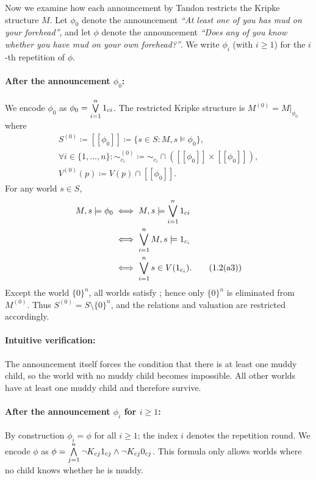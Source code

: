 Now we examine how each announcement by Tandon restricts the 
Kripke structure $M$. Let $\phi_0$ denote the announcement 
\emph{``At least one of you has mud on your forehead''}, 
and let $\phi$ denote the announcement 
\emph{``Does any of you know whether you have mud on your own forehead?''}. 
We write $\phi_i$ (with $i \ge 1$) for the $i$-th repetition of $\phi$.

\paragraph*{After the announcement $\phi_0$:}
We encode $\phi_0$ as $\phi_0 = \bigvee\limits_{i=1}^{n} 1_{ci}$. The restricted Kripke structure 
is $M^{(0)} = M|_{\phi_0}$ where
\begin{gather*}
    S^{(0)} \coloneqq [\![ \phi_0 ]\!] \coloneqq 
        \{ s \in S : M,s \models \phi_0 \}, \\
    \forall i \in \{1,\dots,n\}: 
        \sim_{c_i}^{(0)} \coloneqq 
        \sim_{c_i} \cap ([\![ \phi_0 ]\!] \times [\![ \phi_0 ]\!]), \\
    V^{(0)}(p) \coloneqq V(p) \cap [\![ \phi_0 ]\!].
    \tag{1.2(a2)}\label{eq:1.2(a2)}
\end{gather*}
For any world $s \in S$,
\begin{align*}
    M,s \models \phi_0 
        &\iff M,s \models \bigvee\limits_{i=1}^{n} 1_{ci} \\
        &\iff \bigvee_{i=1}^{n} M,s \models 1_{c_i} \\
        &\iff \bigvee_{i=1}^{n} s \in V(1_{c_i}). \tag{1.2(a3)}\label{eq:1.2(a3)}
\end{align*}
Except the world $\{0\}^n$, all worlds satisfy ; hence only $\{0\}^n$ 
is eliminated from $M^{(0)}$. Thus $S^{(0)} = S \setminus \{0\}^n$, and 
the relations and valuation are restricted accordingly.

\paragraph{Intuitive verification:} The announcement itself forces 
the condition that there is at least one muddy child, so the world 
with no muddy child becomes impossible. All other worlds have at least 
one muddy child and therefore survive.

\paragraph*{After the announcement $\phi_i$ for $i \ge 1$:}
By construction $\phi_i = \phi$ for all $i \ge 1$; the index $i$ denotes 
the repetition round. We encode $\phi$ as $\phi = \bigwedge\limits_{j=1}^{n} \neg K_{cj}1_{cj} \land \neg K_{cj}0_{cj}$. This formula 
only allows worlds where no child knows whether he is muddy.

